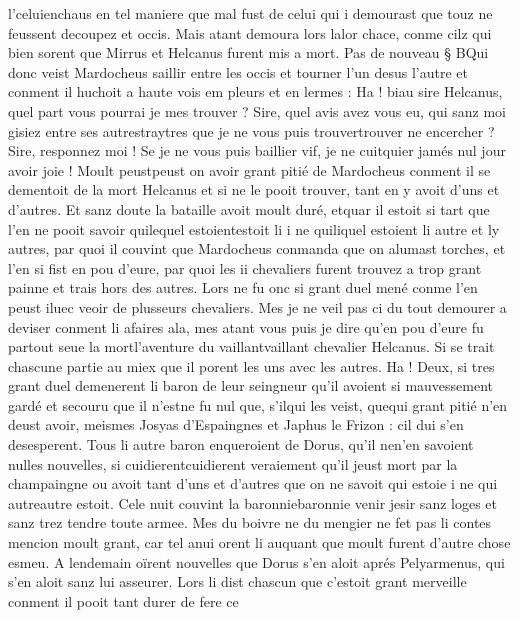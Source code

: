 \documentclass{article}
\begin{document}
\begin{pages}
   l’celuienchaus en tel maniere que mal fust de celui qui i demourast que 
   touz ne feussent decoupez et occis. Mais atant demoura lors 
   lalor chace, conme cilz qui bien sorent que 
   Mirrus et Helcanus furent mis a mort. \pend
            \pstart Pas de nouveau § BQui donc veist 
   Mardocheus saillir entre les occis 
   et tourner l’un desus l’autre et conment il huchoit a haute vois em pleurs et en lermes :
   Ha ! biau sire Helcanus, quel part vous pourrai je mes trouver ? 
      Sire, quel avis avez vous eu, qui sanz moi gisiez entre ses autrestraytres 
      que je ne vous puis trouvertrouver ne encercher ? Sire, responnez moi ! 
      Se je ne vous puis baillier vif, je ne cuitquier jamés nul jour avoir 
      joie ! 
   Moult peustpeust on avoir grant pitié de Mardocheus conment il se dementoit 
   de la mort Helcanus et si ne le pooit trouver, tant en y avoit d’uns et d’autres. 
   Et sanz doute la bataille avoit moult duré, etquar il estoit si tart que 
   l’en ne pooit savoir quilequel 
   estoientestoit li i 
   ne quiliquel estoient li autre
      et ly autres, par quoi il couvint que Mardocheus conmanda que on 
   alumast torches, et l’en si fist en pou d’eure, par quoi les 
   ii chevaliers furent trouvez a trop grant painne et trais hors des autres. Lors ne fu onc si grant duel mené conme l’en 
   peust iluec veoir de plusseurs chevaliers. 
   Mes je ne veil pas ci du tout demourer a deviser conment li afaires ala, mes atant vous puis je dire qu’en 
   pou d’eure fu partout seue la mortl'aventure du 
   vaillantvaillant chevalier 
   Helcanus. Si se trait chascune partie au miex que il porent les uns avec les autres. Ha ! Deux, 
   si tres grant duel demenerent li baron de leur seingneur qu’il avoient si mauvessement gardé 
               et secouru que il n’estne fu nul
   que, s’ilqui les veist, 
   quequi grant pitié n’en deust avoir, 
   meismes Josyas d’Espaingnes 
   et Japhus le Frizon : cil dui s’en desesperent. Tous li autre baron enqueroient de 
   Dorus, qu’il nen'en savoient nulles 
   nouvelles, si cuidierentcuidierent veraiement qu’il jeust mort par la 
   champaingne ou avoit tant d’uns et d’autres que on ne savoit qui estoie i ne qui 
   autreautre estoit. \pend
\pstart Cele nuit couvint la baronniebaronnie venir 
   jesir sanz loges et sanz trez tendre toute armee. Mes du boivre ne du mengier ne fet pas li contes mencion moult 
      grant, car tel anui orent li auquant que moult furent d’autre chose esmeu. A lendemain oïrent nouvelles que 
   Dorus s’en aloit aprés Pelyarmenus, qui s’en aloit sanz lui 
   asseurer. Lors li dist chascun que c’estoit grant merveille conment il pooit tant durer de fere ce 

\end{pages}
\end{document}
